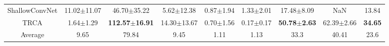 \begin{table*}
\begin{adjustbox}{width=\textwidth}
\begin{tabular}{c|ccccccc|c}
ShallowConvNet &                   11.02$\pm$11.07 &                    46.70$\pm$35.22 &                    5.62$\pm$12.38 &                   0.87$\pm$1.94 &                   1.33$\pm$2.01 &                   17.48$\pm$8.09 &             NaN &          13.84 \\
          TRCA &                     1.64$\pm$1.29 & \textbf{112.57}$\pm$\textbf{16.91} &                   14.30$\pm$13.67 &                   0.70$\pm$1.56 &                   0.17$\pm$0.17 & \textbf{50.78}$\pm$\textbf{2.63} &  62.39$\pm$2.66 & \textbf{34.65} \\
       Average &                              9.65 &                              79.84 &                              9.45 &                            1.11 &                            1.13 &                             33.3 &           40.41 &           23.6 \\
\bottomrule
\end{tabular}\end{adjustbox}
\end{table*}
